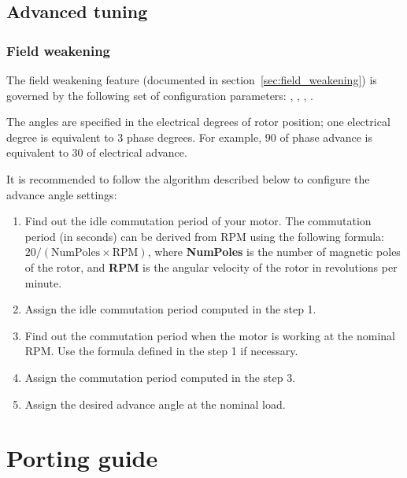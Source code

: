 \documentclass{zubaxdoc}
\begin{document}
\section{Advanced tuning}

\subsection{Field weakening}

The field weakening feature (documented in section~\ref{sec:field_weakening}) is governed by the following
set of configuration parameters:
, , , .

The angles are specified in the electrical degrees of rotor position;
one electrical degree is equivalent to 3 phase degrees.
For example, 90\textdegree{} of phase advance is equivalent to 30\textdegree{} of electrical advance.

It is recommended to follow the algorithm described below to configure the advance angle settings:

\begin{enumerate}
    \item Find out the idle commutation period of your motor.
          The commutation period (in seconds) can be derived from RPM using the following formula:
          $20 / (\text{NumPoles}\times\text{RPM})$, where \textbf{NumPoles} is the number of magnetic poles
          of the rotor, and \textbf{RPM} is the angular velocity of the rotor in revolutions per minute.

    \item Assign  the idle commutation period computed in the step 1.

    \item Find out the commutation period when the motor is working at the nominal RPM.
          Use the formula defined in the step 1 if necessary.

    \item Assign  the commutation period computed in the step 3.

    \item Assign  the desired advance angle at the nominal load.
\end{enumerate}

\chapter{Porting guide}\label{sec:porting_guide}
\end{document}
